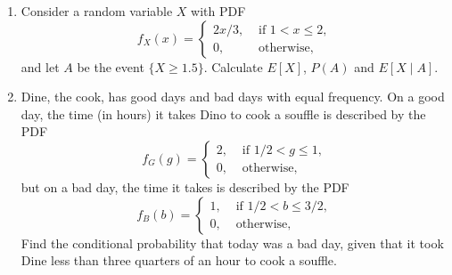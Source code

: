 \documentclass[paper=usletter, fontsize=12pt]{article}
\begin{document}
\begin{enumerate}
\begin{enumerate}
\begin{cproof}
            \end{cproof}

        \end{enumerate}

        \item Consider a random variable $X$ with PDF
        \begin{equation*}
            f_X(x) = \begin{cases}
                2x/3, & \text{ if } 1 < x \le 2,\\
                0, & \text{ otherwise, }
            \end{cases}
        \end{equation*}
        and let $A$ be the event $\{X \ge 1.5\}$. Calculate $E[X]$, $P(A)$ and
        $E[X \mid A]$.
        \begin{cproof}
        \end{cproof}

        \item Dine, the cook, has good days and bad days with equal frequency.
        On a good day, the time (in hours) it takes Dino to cook a souffle is
        described by the PDF
        \begin{equation*}
            f_G(g) = \begin{cases}
                2, & \text{ if } 1/2 < g \le 1,\\
                0, & \text{ otherwise, }
            \end{cases}
        \end{equation*}
        but on a bad day, the time it takes is described by the PDF
        \begin{equation*}
            f_B(b) = \begin{cases}
                1, & \text{ if } 1/2 < b \le 3/2,\\
                0, & \text{ otherwise, }
            \end{cases}
        \end{equation*}
        Find the conditional probability that today was a bad day, given that
        it took Dine less than three quarters of an hour to cook a souffle.
        \begin{cproof}
        \end{cproof}


\end{enumerate}
\end{document}
